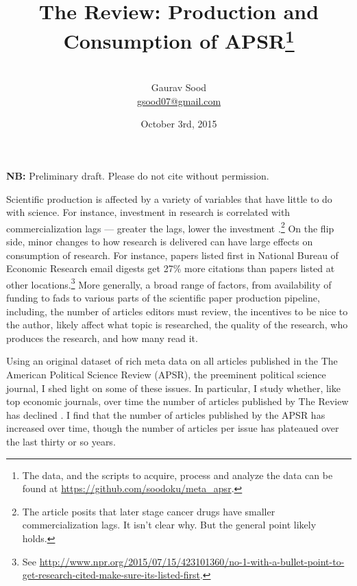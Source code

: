 \documentclass[12pt]{article}
\begin{document}
\title{\vspace{-.5cm}\normalsize{The Review: Production and Consumption of APSR\footnote{The data, and the scripts to acquire, process and analyze the data can be found at \href{https://github.com/soodoku/meta_apsr}{https://github.com/soodoku/meta\_apsr}.}
}}
\author{\vspace{.2cm}\\\normalsize{Gaurav Sood}\\\href{mailto:gsood07@gmail.com}{\small{gsood07@gmail.com}}\vspace{.3cm}\\}
\date{\normalsize{October 3rd, 2015}}
\maketitle
\begin{center}
\textbf{NB:} Preliminary draft. Please do not cite without permission.
\end{center}
\vspace{.4cm}
\doublespacing

Scientific production is affected by a variety of variables that have little to do with science. For instance, investment in research is correlated with commercialization lags --- greater the lags, lower the investment \citep{budish2013firms}.\footnote{The article posits that later stage cancer drugs have smaller commercialization lags. It isn't clear why. But the general point likely holds.} On the flip side, minor changes to how research is delivered can have large effects on consumption of research. For instance, papers listed first in National Bureau of Economic Research email digests get 27\% more citations than papers listed at other locations.\footnote{ See \href{http://www.npr.org/2015/07/15/423101360/no-1-with-a-bullet-point-to-get-research-cited-make-sure-its-listed-first}{http://www.npr.org/2015/07/15/423101360/no-1-with-a-bullet-point-to-get-research-cited-make-sure-its-listed-first}.} More generally, a broad range of factors, from availability of funding to fads to various parts of the scientific paper production pipeline, including, the number of articles editors must review, the incentives to be nice to the author, likely affect what topic is researched, the quality of the research, who produces the research, and how many read it. 

Using an original dataset of rich meta data on all articles published in the The American Political Science Review (APSR), the preeminent political science journal, I shed light on some of these issues. In particular, I study whether, like top economic journals, over time the number of articles published by The Review has declined \citep{card2013nine, card2014page}. I find that the number of articles published by the APSR has increased over time, though the number of articles per issue has plateaued over the last thirty or so years.
\end{document}
